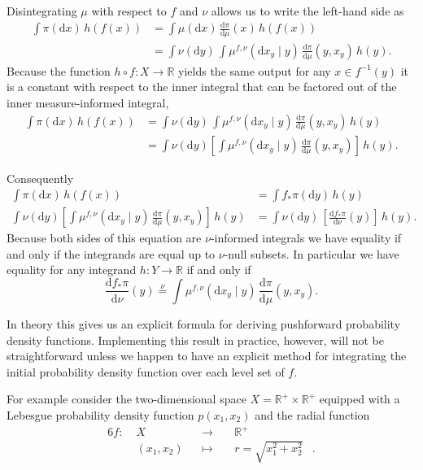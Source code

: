\documentclass[
  letterpaper,
  DIV=11,
  numbers=noendperiod]{scrartcl}
\begin{document}
Disintegrating \(\mu\) with respect to \(f\) and \(\nu\) allows us to
write the left-hand side as \begin{align*}
\int \pi( \mathrm{d} x ) \, h(f(x))
&=
\int \mu( \mathrm{d} x ) \, \frac{ \mathrm{d} \pi}{ \mathrm{d} \mu }(x) \, h(f(x))
\\
&=
\int \nu( \mathrm{d} y ) \,
\int \mu^{f, \nu}( \mathrm{d} x_{y} \mid y ) \,
\frac{ \mathrm{d} \pi}{ \mathrm{d} \mu }(y, x_{y}) \, h(y).
\end{align*} Because the function
\(h \circ f : X \rightarrow \mathbb{R}\) yields the same output for any
\(x \in f^{-1}(y)\) it is a constant with respect to the inner integral
that can be factored out of the inner measure-informed integral,
\begin{align*}
\int \pi( \mathrm{d} x ) \, h(f(x))
&=
\int \nu( \mathrm{d} y ) \,
\int \mu^{f, \nu}( \mathrm{d} x_{y} \mid y ) \,
\frac{ \mathrm{d} \pi}{ \mathrm{d} \mu }(y, x_{y}) \, h(y)
\\
&=
\int \nu( \mathrm{d} y )
\left[ \int \mu^{f, \nu}( \mathrm{d} x_{y} \mid y )
       \, \frac{ \mathrm{d} \pi}{ \mathrm{d} \mu }(y, x_{y}) \right] \, h(y).
\end{align*}

Consequently \begin{align*}
\int \pi( \mathrm{d} x ) \, h(f(x))
&=
\int f_{*} \pi( \mathrm{d} y ) \, h(y)
\\
\int \nu( \mathrm{d} y )
\left[ \int \mu^{f, \nu}( \mathrm{d} x_{y} \mid y )
       \, \frac{ \mathrm{d} \pi}{ \mathrm{d} \mu }(y, x_{y}) \right] \, h(y)
&=
\int \nu( \mathrm{d} y ) \,
\left[ \frac{ \mathrm{d} f_{*}\pi}{ \mathrm{d} \nu }(y) \right] \, h(y).
\end{align*} Because both sides of this equation are \(\nu\)-informed
integrals we have equality if and only if the integrands are equal up to
\(\nu\)-null subsets. In particular we have equality for any integrand
\(h : Y \rightarrow \mathbb{R}\) if and only if \[
\frac{ \mathrm{d} f_{*}\pi}{ \mathrm{d} \nu }(y)
\overset{\nu}{=}
\int \mu^{f, \nu}( \mathrm{d} x_{y} \mid y ) \,
\frac{ \mathrm{d} \pi}{ \mathrm{d} \mu }(y, x_{y}).
\]

In theory this gives us an explicit formula for deriving pushforward
probability density functions. Implementing this result in practice,
however, will not be straightforward unless we happen to have an
explicit method for integrating the initial probability density function
over each level set of \(f\).

For example consider the two-dimensional space
\(X = \mathbb{R}^{+} \times \mathbb{R}^{+}\) equipped with a Lebesgue
probability density function \(p(x_{1}, x_{2})\) and the radial function
\begin{alignat*}{6}
f :\; &X& &\rightarrow& \; &\mathbb{R}^{+}&
\\
&(x_{1}, x_{2})& &\mapsto& &r = \sqrt{ x_{1}^{2} + x_{2}^{2} }&.
\end{alignat*}
\end{document}
